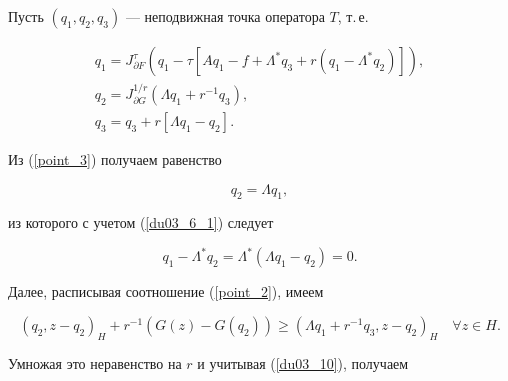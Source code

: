 \begin{pf}


Пусть $(q_1, q_2, q_3)$ --- неподвижная точка оператора $T$, т.\,е. 


\begin{gather}


q_1=J_{\partial F}^{\tau} (q_1-\tau 


[ {A q_1- f+\Lambda ^*q_3+ r (q_1- \Lambda ^*q_2)} ]), \label{point_1}\\


%


q_2 =J_{\partial G}^{1/r} (\Lambda q_1 +r^{-1} q_3), \label{point_2}\\


%


q_3 =q_3+r [ {\Lambda q_1-q_2} ]. \label{point_3}


\end{gather}


Из (\ref{point_3}) получаем равенство


\begin{equation}


 q_2=\Lambda q_1 ,


\label{du03_10}


\end{equation}


из которого с учетом (\ref{du03_6_1}) следует


\begin{equation}


 q_1- \Lambda ^*q_2=\Lambda ^* (\Lambda q_1-q_2)=0 .


\label{du03_10_1}


\end{equation}





Далее, расписывая соотношение (\ref{point_2}), имеем


\begin{equation}


({q_2 , z-q_2})_H+r^{-1} (G(z)-G(q_2)) 


\geq (\Lambda q_1+ r^{-1}q_3 , z-q_2)_H


\quad \forall z \in H .


\label{du03_11}


\end{equation}


Умножая это неравенство на $r$ и учитывая (\ref{du03_10}), получаем


\begin{equation}



\end{equation}
\end{pf}
